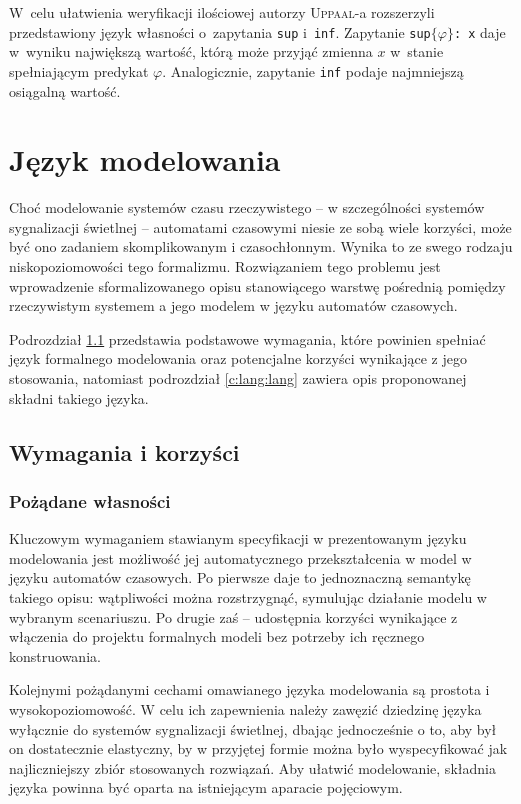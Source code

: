 \documentclass{pracamgr}
\newcommand{\upp}{\textsc{Uppaal}}
\theoremstyle{plain}
\begin{document}
W~celu ułatwienia weryfikacji ilościowej autorzy \upp-a rozszerzyli
przedstawiony język własności o~zapytania \texttt{sup} i~\texttt{inf}.
Zapytanie \texttt{sup$\{\varphi\}$: x} daje w~wyniku największą wartość,
którą może przyjąć zmienna $x$ w~stanie spełniającym predykat $\varphi$.
Analogicznie, zapytanie \texttt{inf} podaje najmniejszą osiągalną wartość.

\chapter{Język modelowania}

Choć modelowanie systemów czasu rzeczywistego -- w szczególności
systemów sygnalizacji świetlnej -- automatami czasowymi niesie ze sobą
wiele korzyści, może być ono zadaniem skomplikowanym i
czasochłonnym. Wynika to ze swego rodzaju niskopoziomowości tego
formalizmu. Rozwiązaniem tego problemu jest wprowadzenie
sformalizowanego opisu stanowiącego warstwę pośrednią pomiędzy
rzeczywistym systemem a jego modelem w języku automatów czasowych.

Podrozdział \ref{c:lang:req} przedstawia podstawowe wymagania, które
powinien spełniać język formalnego modelowania oraz potencjalne
korzyści wynikające z jego stosowania, natomiast podrozdział
\ref{c:lang:lang} zawiera opis proponowanej składni takiego języka.

\section{Wymagania i korzyści}
\label{c:lang:req}

\subsection{Pożądane własności}

Kluczowym wymaganiem stawianym specyfikacji w prezentowanym języku
modelowania jest możliwość jej automatycznego przekształcenia w model
w języku automatów czasowych. Po pierwsze daje to jednoznaczną
semantykę takiego opisu: wątpliwości można rozstrzygnąć, symulując
działanie modelu w wybranym scenariuszu. Po drugie zaś -- udostępnia
korzyści wynikające z włączenia do projektu formalnych modeli bez
potrzeby ich ręcznego konstruowania.

Kolejnymi pożądanymi cechami omawianego języka modelowania są prostota
i wysokopoziomowość. W celu ich zapewnienia należy zawęzić dziedzinę
języka wyłącznie do systemów sygnalizacji świetlnej, dbając
jednocześnie o to, aby był on dostatecznie elastyczny, by w przyjętej
formie można było wyspecyfikować jak najliczniejszy zbiór stosowanych
rozwiązań. Aby ułatwić modelowanie, składnia języka powinna być oparta
na istniejącym aparacie pojęciowym.
\end{document}
